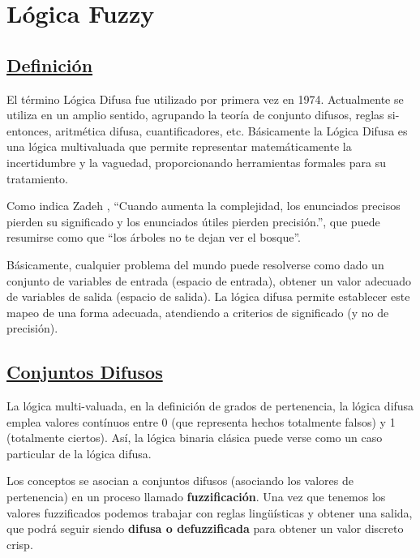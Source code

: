 \documentclass[10pt,conference]{IEEEtran}
\begin{document}
\section{\textbf{Lógica Fuzzy}} 
\subsection{\textbf{\underline{Definición}}}
El término Lógica Difusa fue utilizado por primera vez en 1974. Actualmente se utiliza en un amplio sentido, agrupando la teoría de conjunto difusos, reglas si-entonces, aritmética difusa, cuantificadores, etc. Básicamente la Lógica Difusa es una lógica multivaluada que permite representar matemáticamente la incertidumbre y la vaguedad, proporcionando herramientas formales para su tratamiento.\par
Como indica Zadeh \citep{zadeh1973outline}, “Cuando aumenta la complejidad, los enunciados precisos pierden su significado y los enunciados útiles pierden precisión.”, que puede resumirse como que “los árboles no te dejan ver el bosque”. \par
Básicamente, cualquier problema del mundo puede resolverse como dado un conjunto de variables de entrada (espacio de entrada), obtener un valor adecuado de variables de salida (espacio de salida). La lógica difusa permite establecer este mapeo de una forma adecuada, atendiendo a criterios de significado (y no de precisión). \par
\subsection{\textbf{\underline{Conjuntos Difusos}}}
La lógica multi-valuada, en la definición de grados de pertenencia, la lógica difusa emplea valores contínuos entre 0 (que representa hechos totalmente falsos) y 1 (totalmente ciertos). Así, la lógica binaria clásica puede verse como un caso particular de la lógica difusa. \par
Los conceptos se asocian a conjuntos difusos (asociando los valores de pertenencia) en un proceso llamado \textbf{fuzzificación}. Una vez que tenemos los valores fuzzificados podemos trabajar con reglas lingüísticas y obtener una salida, que podrá seguir siendo \textbf{difusa o defuzzificada} para obtener un valor discreto crisp.\par
\end{document}

